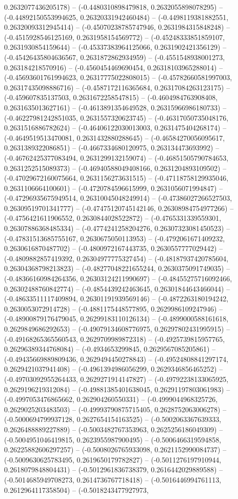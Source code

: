 0.2632077436205178) -- (-0.4480310898479818, 0.2632055898078295) -- (-0.44892150553994625, 0.26320331942460484) -- (-0.4498119381882551, 0.26320093312945414) -- (-0.45070238785747946, 0.2631984315848248) -- (-0.4515928546125169, 0.2631958154569772) -- (-0.45248333851859107, 0.2631930854159644) -- (-0.45337383964125066, 0.2631902421356129) -- (-0.45426435804636567, 0.2631872862934959) -- (-0.4551548938001273, 0.263184218570916) -- (-0.4560454469690454, 0.26318103965288014) -- (-0.45693601761994623, 0.26317775022808015) -- (-0.45782660581997003, 0.26317435098886716) -- (-0.4587172116365684, 0.26317084263123175) -- (-0.459607835137503, 0.2631672258547815) -- (-0.4604984763908408, 0.2631635013627161) -- (-0.4613891354649528, 0.26315966986180733) -- (-0.46227981242851035, 0.2631557320623745) -- (-0.46317050735048176, 0.2631516886782624) -- (-0.46406122030013003, 0.2631475404268174) -- (-0.4649519513470081, 0.2631432880288645) -- (-0.46584270056095617, 0.2631389322086851) -- (-0.4667334680120975, 0.263134473693992) -- (-0.46762425377083494, 0.2631299132159074) -- (-0.46851505790784653, 0.2631252515089373) -- (-0.46940588049408166, 0.2631204893109502) -- (-0.47029672160075664, 0.2631156273631515) -- (-0.47118758129935046, 0.2631106664100601) -- (-0.4720784596615999, 0.2631056071994847) -- (-0.47296935675949514, 0.26310045048249914) -- (-0.47386027266527503, 0.26309519701341777) -- (-0.47475120745142146, 0.26308984754977266) -- (-0.4756421611906552, 0.2630844028522872) -- (-0.4765331339559301, 0.26307886368485334) -- (-0.4774241258204276, 0.26307323081450523) -- (-0.47831513685755167, 0.2630675050113953) -- (-0.4792061671409232, 0.2630616870487702) -- (-0.4800972167443735, 0.2630557777029442) -- (-0.4809882857419392, 0.26304977775327454) -- (-0.48187937420785604, 0.26304368798213823) -- (-0.48277048221655244, 0.2630375091749035) -- (-0.48366160984264356, 0.26303124211990697) -- (-0.48455275716092466, 0.26302488760842774) -- (-0.4854439242463645, 0.26301844643466044) -- (-0.48633511117409894, 0.26301191939569146) -- (-0.4872263180194242, 0.2630053072914728) -- (-0.4881175448577895, 0.2629986109247946) -- (-0.48900879176479045, 0.26299183110126134) -- (-0.4899000588161618, 0.2629849686292653) -- (-0.49079134608776975, 0.26297802431995915) -- (-0.49168265365560543, 0.2629709989872318) -- (-0.4925739815957765, 0.26296389344768084) -- (-0.4934653299845, 0.2629567085205861) -- (-0.49435669889809436, 0.2629494450278843) -- (-0.49524808841297174, 0.2629421037941408) -- (-0.4961394986056299, 0.2629346856465252) -- (-0.49703092955264433, 0.2629271914147827) -- (-0.49792238133065925, 0.2629196219312084) -- (-0.49881385401638045, 0.26291197803061983) -- (-0.4997053476865662, 0.262904260550331) -- (-0.4999044968325726, 0.2629025203483503) -- (-0.49993790875715405, 0.2628752063006278) -- (-0.5000694799937128, 0.2627654154163525) -- (-0.5002063367639333, 0.2626488889227889) -- (-0.5003482767353963, 0.2625256186049309) -- (-0.5004951046419815, 0.2623955987900495) -- (-0.5006466319594858, 0.26225882606297257) -- (-0.5008026765933098, 0.2621152990084737) -- (-0.5009630625783495, 0.2619650179782827) -- (-0.5011276197910944, 0.2618079848804431) -- (-0.5012961836738379, 0.2616442029889588) -- (-0.5014685949708273, 0.2614736767718418) -- (-0.5016446994761113, 0.2612964117358504) -- (-0.5018243477927973, 